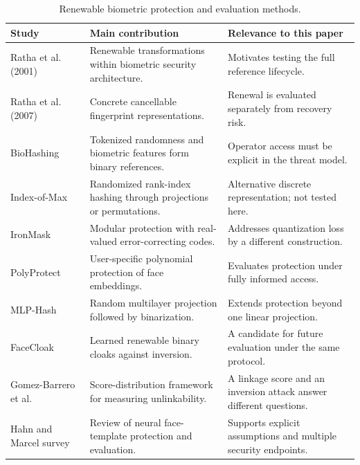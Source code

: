 \begin{table}[t]
\caption{Renewable biometric protection and evaluation methods.}
\label{tab:review2}\centering\footnotesize
\begin{tabularx}{\textwidth}{@{}>{\raggedright\arraybackslash}p{3.1cm}>{\raggedright\arraybackslash}X>{\raggedright\arraybackslash}X@{}}\toprule
Study & Main contribution & Relevance to this paper \\ \midrule
Ratha et al. (2001)~\cite{ratha2001enhancing} & Renewable transformations within biometric security architecture. & Motivates testing the full reference lifecycle.\\[3pt]
Ratha et al. (2007)~\cite{ratha2007cancelable} & Concrete cancellable fingerprint representations. & Renewal is evaluated separately from recovery risk.\\[3pt]
BioHashing~\cite{teoh2004biohashing} & Tokenized randomness and biometric features form binary references. & Operator access must be explicit in the threat model.\\[3pt]
Index-of-Max~\cite{iom2018} & Randomized rank-index hashing through projections or permutations. & Alternative discrete representation; not tested here.\\[3pt]
IronMask~\cite{ironmask} & Modular protection with real-valued error-correcting codes. & Addresses quantization loss by a different construction.\\[3pt]
PolyProtect~\cite{polyprotect} & User-specific polynomial protection of face embeddings. & Evaluates protection under fully informed access.\\[3pt]
MLP-Hash~\cite{mlphash} & Random multilayer projection followed by binarization. & Extends protection beyond one linear projection.\\[3pt]
FaceCloak~\cite{facecloak} & Learned renewable binary cloaks against inversion. & A candidate for future evaluation under the same protocol.\\[3pt]
Gomez-Barrero et al.~\cite{gomezbarrero2018unlinkability} & Score-distribution framework for measuring unlinkability. & A linkage score and an inversion attack answer different questions.\\[3pt]
Hahn and Marcel survey~\cite{hahn2022survey} & Review of neural face-template protection and evaluation. & Supports explicit assumptions and multiple security endpoints.\\[3pt]
\bottomrule\end{tabularx}
\end{table}

